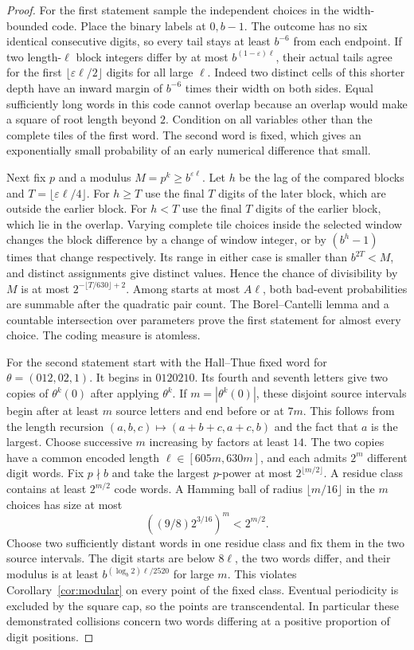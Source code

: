 \begin{proof}
For the first statement sample the independent choices in the width-bounded code. Place the binary labels at $0,b-1$. The outcome has no six identical consecutive digits, so every tail stays at least $b^{-6}$ from each endpoint. If two length-$\ell$ block integers differ by at most $b^{(1-\varepsilon)\ell}$, their actual tails agree for the first $\lfloor\varepsilon\ell/2\rfloor$ digits for all large $\ell$. Indeed two distinct cells of this shorter depth have an inward margin of $b^{-6}$ times their width on both sides. Equal sufficiently long words in this code cannot overlap because an overlap would make a square of root length beyond $2$. Condition on all variables other than the complete tiles of the first word. The second word is fixed, which gives an exponentially small probability of an early numerical difference that small.

Next fix $p$ and a modulus $M=p^k\ge b^{\varepsilon\ell}$. Let $h$ be the lag of the compared blocks and $T=\lfloor\varepsilon\ell/4\rfloor$. For $h\ge T$ use the final $T$ digits of the later block, which are outside the earlier block. For $h<T$ use the final $T$ digits of the earlier block, which lie in the overlap. Varying complete tile choices inside the selected window changes the block difference by a change of window integer, or by $(b^h-1)$ times that change respectively. Its range in either case is smaller than $b^{2T}<M$, and distinct assignments give distinct values. Hence the chance of divisibility by $M$ is at most $2^{-\lfloor T/630\rfloor+2}$. Among starts at most $A\ell$, both bad-event probabilities are summable after the quadratic pair count. The Borel--Cantelli lemma and a countable intersection over parameters prove the first statement for almost every choice. The coding measure is atomless.

For the second statement start with the Hall--Thue fixed word for $\theta=(012,02,1)$. It begins in $0120210$. Its fourth and seventh letters give two copies of $\theta^k(0)$ after applying $\theta^k$. If $m=|\theta^k(0)|$, these disjoint source intervals begin after at least $m$ source letters and end before or at $7m$. This follows from the length recursion $(a,b,c)\mapsto(a+b+c,a+c,b)$ and the fact that $a$ is the largest. Choose successive $m$ increasing by factors at least $14$. The two copies have a common encoded length $\ell\in[605m,630m]$, and each admits $2^m$ different digit words. Fix $p\nmid b$ and take the largest $p$-power at most $2^{\lfloor m/2\rfloor}$. A residue class contains at least $2^{m/2}$ code words. A Hamming ball of radius $\lfloor m/16\rfloor$ in the $m$ choices has size at most
\[
 ((9/8)2^{3/16})^m<2^{m/2}.
\]
Choose two sufficiently distant words in one residue class and fix them in the two source intervals. The digit starts are below $8\ell$, the two words differ, and their modulus is at least $b^{(\log_b2)\ell/2520}$ for large $m$. This violates Corollary~\ref{cor:modular} on every point of the fixed class. Eventual periodicity is excluded by the square cap, so the points are transcendental. In particular these demonstrated collisions concern two words differing at a positive proportion of digit positions.


\end{proof}
